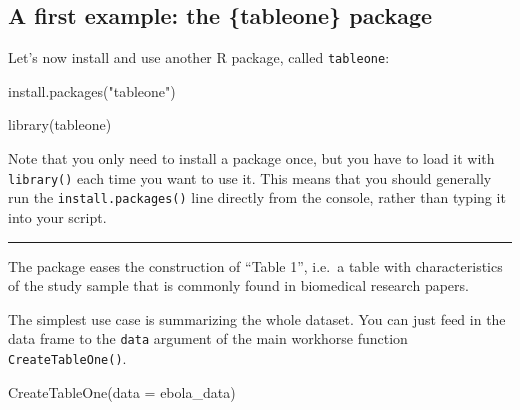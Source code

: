 \documentclass[
  letterpaper,
  DIV=11,
  numbers=noendperiod]{scrreprt}
\newenvironment{Shaded}{\begin{snugshade}}{\end{snugshade}}
\newcommand{\AttributeTok}[1]{\textcolor[rgb]{0.40,0.45,0.13}{#1}}
\newcommand{\FunctionTok}[1]{\textcolor[rgb]{0.28,0.35,0.67}{#1}}
\newcommand{\NormalTok}[1]{\textcolor[rgb]{0.00,0.23,0.31}{#1}}
\newcommand{\StringTok}[1]{\textcolor[rgb]{0.13,0.47,0.30}{#1}}
\begin{document}
\hypertarget{a-first-example-the-tableone-package}{%
\subsection{A first example: the \{tableone\}
package}\label{a-first-example-the-tableone-package}}

Let's now install and use another R package, called \texttt{tableone}:

\begin{Shaded}
\begin{Highlighting}[]
\FunctionTok{install.packages}\NormalTok{(}\StringTok{"tableone"}\NormalTok{)}
\end{Highlighting}
\end{Shaded}

\begin{Shaded}
\begin{Highlighting}[]
\FunctionTok{library}\NormalTok{(tableone)}
\end{Highlighting}
\end{Shaded}

Note that you only need to install a package once, but you have to load
it with \texttt{library()} each time you want to use it. This means that
you should generally run the \texttt{install.packages()} line directly
from the console, rather than typing it into your script.

\begin{center}\rule{0.5\linewidth}{0.5pt}\end{center}

The package eases the construction of ``Table 1'', i.e.~a table with
characteristics of the study sample that is commonly found in biomedical
research papers.

The simplest use case is summarizing the whole dataset. You can just
feed in the data frame to the \texttt{data} argument of the main
workhorse function \texttt{CreateTableOne()}.

\begin{Shaded}
\begin{Highlighting}[]
\FunctionTok{CreateTableOne}\NormalTok{(}\AttributeTok{data =}\NormalTok{ ebola\_data)}
\end{Highlighting}
\end{Shaded}
\end{document}
